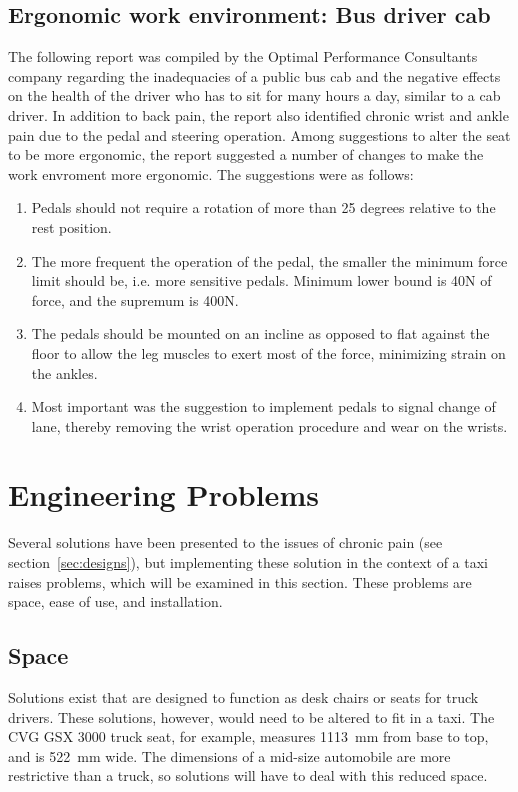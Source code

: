\documentclass[11pt]{article}
\begin{document}
\subsection{Ergonomic work environment: Bus driver cab}
The following report was compiled by the Optimal Performance Consultants company regarding the 
inadequacies of a public bus cab and the negative effects on the health of the driver who has to sit 
for many hours a day, similar to a cab driver\cite{Ismail2003}. In addition to back pain, the report also 
identified chronic wrist and ankle pain due to the pedal and steering operation. Among suggestions to alter the 
seat to be more ergonomic, the report suggested a number of changes to make the work envroment more ergonomic. 
The suggestions were as follows:
\begin{enumerate}
\item Pedals should not require a rotation of more than 25 degrees relative to the rest position. 
\item The more frequent the operation of the pedal, the smaller the minimum force limit should be, 
i.e. more sensitive pedals. Minimum lower bound is 40N of force, and the supremum is 400N.
\item The pedals should be mounted on an incline as opposed to flat against the floor to allow the leg 
muscles to exert most of the force, minimizing strain on the ankles. 
\item Most important was the suggestion to implement pedals to signal change of lane, thereby removing 
the wrist operation procedure and wear on the wrists\cite{Ismail2003}. 
\end{enumerate}



\section{Engineering Problems}
\label{sec:engprob}
Several solutions have been presented to the issues of chronic pain
(see section~\ref{sec:designs}), but implementing these solution in the context
of a taxi raises problems, which will be examined in this section. These 
problems are space, ease of use, and installation.

\subsection{Space}
\label{sec:space}

Solutions exist that are designed to function as desk chairs or seats for truck
drivers. These solutions, however, would need to be altered to fit in
a taxi. The CVG GSX 3000 truck seat, for example, measures 1113~mm from base
to top, and is 522~mm wide. The dimensions of a mid-size automobile
are more restrictive than a truck, so solutions will have to deal with
this reduced space.
\end{document}
